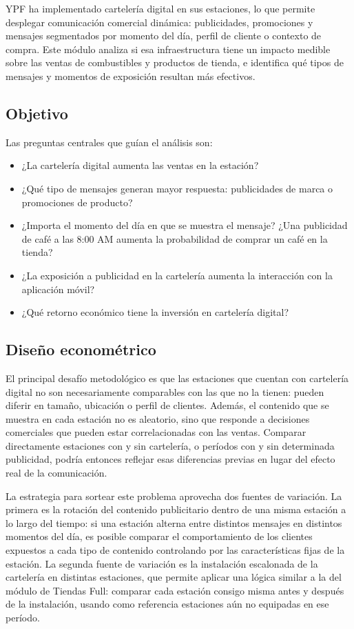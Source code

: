 YPF ha implementado cartelería digital en sus estaciones, lo que permite desplegar 
comunicación comercial dinámica: publicidades, promociones y mensajes segmentados 
por momento del día, perfil de cliente o contexto de compra. Este módulo analiza si 
esa infraestructura tiene un impacto medible sobre las ventas de combustibles y 
productos de tienda, e identifica qué tipos de mensajes y momentos de exposición 
resultan más efectivos.

\subsection{Objetivo}

Las preguntas centrales que guían el análisis son:

\begin{itemize}
    \item ¿La cartelería digital aumenta las ventas en la estación?
    \item ¿Qué tipo de mensajes generan mayor respuesta: publicidades de marca 
    o promociones de producto?
    \item ¿Importa el momento del día en que se muestra el mensaje? ¿Una 
    publicidad de café a las 8:00 AM aumenta la probabilidad de comprar 
    un café en la tienda?
    \item ¿La exposición a publicidad en la cartelería aumenta la interacción 
    con la aplicación móvil?
    \item ¿Qué retorno económico tiene la inversión en cartelería digital?
\end{itemize}

\subsection{Diseño econométrico}

El principal desafío metodológico es que las estaciones que cuentan con cartelería 
digital no son necesariamente comparables con las que no la tienen: pueden diferir 
en tamaño, ubicación o perfil de clientes. Además, el contenido que se muestra en 
cada estación no es aleatorio, sino que responde a decisiones comerciales que pueden 
estar correlacionadas con las ventas. Comparar directamente estaciones con y sin 
cartelería, o períodos con y sin determinada publicidad, podría entonces reflejar esas 
diferencias previas en lugar del efecto real de la comunicación.

La estrategia para sortear este problema aprovecha dos fuentes de variación. La 
primera es la rotación del contenido publicitario dentro de una misma estación a lo 
largo del tiempo: si una estación alterna entre distintos mensajes en distintos 
momentos del día, es posible comparar el comportamiento de los clientes expuestos 
a cada tipo de contenido controlando por las características fijas de la estación. La 
segunda fuente de variación es la instalación escalonada de la cartelería en distintas 
estaciones, que permite aplicar una lógica similar a la del módulo de Tiendas Full: 
comparar cada estación consigo misma antes y después de la instalación, usando como 
referencia estaciones aún no equipadas en ese período.

